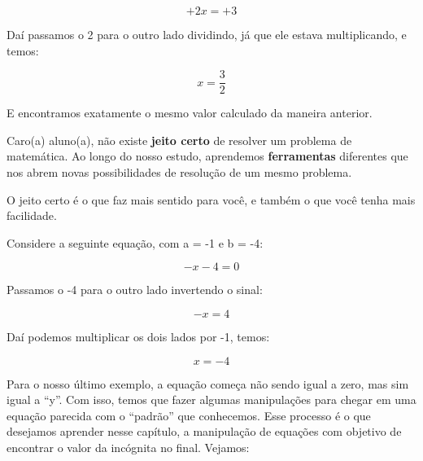 \begin{exemplo}
\begin{enumerate}
        \begin{equation}
            +2x=+3
        \end{equation}

        Daí passamos o 2 para o outro lado dividindo, já que ele estava multiplicando, e temos:

        \begin{equation}
            x=\frac{3}{2}
        \end{equation}

        E encontramos exatamente o mesmo valor calculado da maneira anterior. 
    \end{enumerate}
\end{exemplo}

\begin{tcolorbox}[title=IMPORTANTE]
    Caro(a) aluno(a), não existe \textbf{jeito certo} de resolver um problema de matemática. Ao longo do nosso estudo, aprendemos \textbf{ferramentas} diferentes que nos abrem novas possibilidades de resolução de um mesmo problema.
    
    O jeito certo é o que faz mais sentido para você, e também o que você tenha mais facilidade.
\end{tcolorbox}

\begin{exemplo}
    Considere a seguinte equação, com a = -1 e b = -4:

    \begin{equation}
        -x-4=0
    \end{equation}

    Passamos o -4 para o outro lado invertendo o sinal:
    
    \begin{equation}
        -x=4
    \end{equation}

    Daí podemos multiplicar os dois lados por -1, temos:

    \begin{equation}
        x=-4
    \end{equation}
\end{exemplo}

Para o nosso último exemplo, a equação começa não sendo igual a zero, mas sim igual a “y”. Com isso, temos que fazer algumas manipulações para chegar em uma equação parecida com o “padrão” que conhecemos. Esse processo é o que desejamos aprender nesse capítulo, a manipulação de equações com objetivo de encontrar o valor da incógnita no final. Vejamos:

